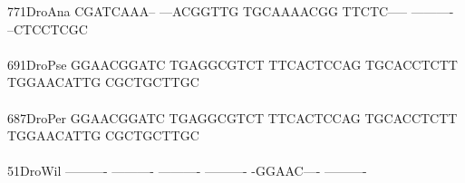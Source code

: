 \documentclass[11pt,twoside,reqno,a4paper]{article}
\begin{document}
{771\hspace*{2\charwidth}DroAna	CGATCAAA--	---ACGGTTG	TGCAAAACGG	TTCTC-----	----------	--CTCCTCGC	\\
\hspace*{5\charwidth}\hspace*{7\charwidth}\hspace*{1\charwidth}\hspace*{1\charwidth}\hspace*{1\charwidth}\hspace*{1\charwidth}\hspace*{1\charwidth}\hspace*{1\charwidth}\\
691\hspace*{2\charwidth}DroPse	GGAACGGATC	TGAGGCGTCT	TTCACTCCAG	TGCACCTCTT	TGGAACATTG	CGCTGCTTGC	\\
\hspace*{5\charwidth}\hspace*{7\charwidth}\hspace*{1\charwidth}\hspace*{1\charwidth}\hspace*{1\charwidth}\hspace*{1\charwidth}\hspace*{1\charwidth}\hspace*{1\charwidth}\\
687\hspace*{2\charwidth}DroPer	GGAACGGATC	TGAGGCGTCT	TTCACTCCAG	TGCACCTCTT	TGGAACATTG	CGCTGCTTGC	\\
\hspace*{5\charwidth}\hspace*{7\charwidth}\hspace*{1\charwidth}\hspace*{1\charwidth}\hspace*{1\charwidth}\hspace*{1\charwidth}\hspace*{1\charwidth}\hspace*{1\charwidth}\\
51\hspace*{3\charwidth}DroWil	----------	----------	----------	----------	-GGAAC----	----------	\\
\hspace*{5\charwidth}\hspace*{7\charwidth}\hspace*{1\charwidth}\hspace*{1\charwidth}\hspace*{1\charwidth}\hspace*{1\charwidth}\hspace*{1\charwidth}\hspace*{1\charwidth}\\
}
\end{document}
